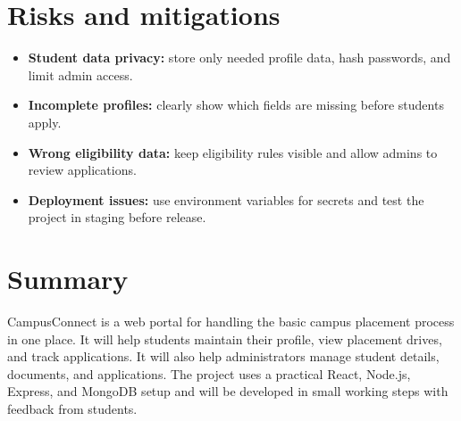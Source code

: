 \documentclass[11pt,a4paper]{article}
\begin{document}
\section{Risks and mitigations}
\begin{itemize}[leftmargin=0.7cm]
  \item \textbf{Student data privacy:} store only needed profile data, hash passwords, and limit admin access.
  \item \textbf{Incomplete profiles:} clearly show which fields are missing before students apply.
  \item \textbf{Wrong eligibility data:} keep eligibility rules visible and allow admins to review applications.
  \item \textbf{Deployment issues:} use environment variables for secrets and test the project in staging before release.
\end{itemize}

\section{Summary}
CampusConnect is a web portal for handling the basic campus placement process in one place. It will help students maintain their profile, view placement drives, and track applications. It will also help administrators manage student details, documents, and applications. The project uses a practical React, Node.js, Express, and MongoDB setup and will be developed in small working steps with feedback from students.
\end{document}
